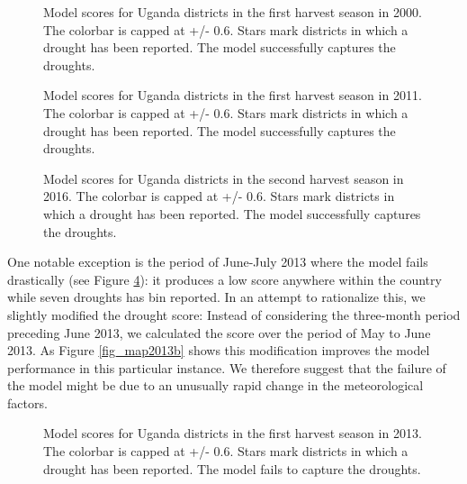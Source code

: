 \documentclass[10pt,parskip=half,
toc=sectionentrywithdots,
bibliography=totocnumbered,
captions=tableheading,numbers=noendperiod]{scrartcl}
\begin{document}
\begin{figure}[H]\begin{center}\end{center}\caption{Model scores for Uganda districts in the first harvest season in 2000.
The colorbar is capped at +/- 0.6. Stars mark districts in which a
drought has been reported. The model successfully captures the droughts.}\label{fig_map2000}\end{figure}

\begin{figure}[H]\begin{center}\end{center}\caption{Model scores for Uganda districts in the first harvest season in 2011.
The colorbar is capped at +/- 0.6. Stars mark districts in which a
drought has been reported. The model successfully captures the droughts.}\label{fig_map2011}\end{figure}

\begin{figure}[H]\begin{center}\end{center}\caption{Model scores for Uganda districts in the second harvest season in 2016.
The colorbar is capped at +/- 0.6. Stars mark districts in which a
drought has been reported. The model successfully captures the droughts.}\label{fig_map2016}\end{figure}

One notable exception is the period of June-July 2013 where the model
fails drastically (see Figure \ref{fig_map2013a}): it produces a low
score anywhere within the country while seven droughts has bin reported.
In an attempt to rationalize this, we slightly modified the drought
score: Instead of considering the three-month period preceding June
2013, we calculated the score over the period of May to June 2013. As
Figure \ref{fig_map2013b} shows this modification improves the model
performance in this particular instance. We therefore suggest that the
failure of the model might be due to an unusually rapid change in the
meteorological factors.

\begin{figure}[H]\begin{center}\end{center}\caption{Model scores for Uganda districts in the first harvest season in 2013.
The colorbar is capped at +/- 0.6. Stars mark districts in which a
drought has been reported. The model fails to capture the droughts.}\label{fig_map2013a}\end{figure}
\end{document}
